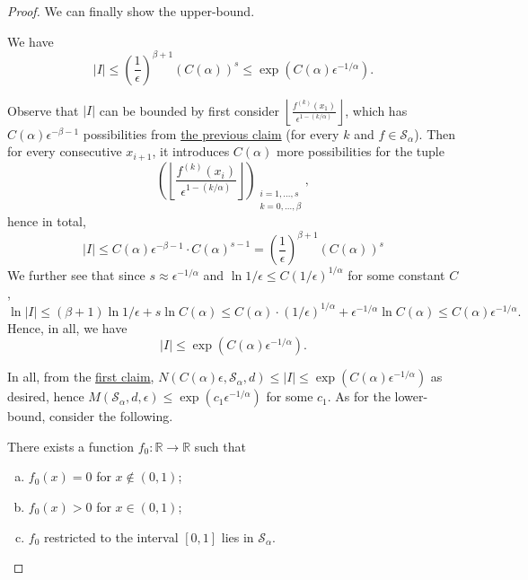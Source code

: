 \begin{proof}
	We can finally show the upper-bound.
	\begin{claim}\label{clm:metric-entropy-e}
		We have
		\[
			\vert I \vert \leq \left( \frac{1}{\epsilon } \right) ^{\beta + 1} (C(\alpha ))^s \leq \exp(C(\alpha ) \epsilon ^{-1 / \alpha }).
		\]
	\end{claim}
	\begin{explanation}
		Observe that \(\vert I \vert \) can be bounded by first consider \(\left\lfloor \frac{f^{(k)}(x_1)}{\epsilon ^{1 - (k / \alpha )}} \right\rfloor\), which has \(C(\alpha )\epsilon ^{-\beta -1}\) possibilities from \hyperref[clm:metric-entropy-b]{the previous claim} (for every \(k\) and \(f\in \mathcal{S} _\alpha \)). Then for every consecutive \(x_{i+1} \), it introduces \(C(\alpha )\) more possibilities for the tuple
		\[
			\left( \left\lfloor \frac{f^{(k)}(x_i)}{\epsilon ^{1 - (k / \alpha )}} \right\rfloor \right)_{\substack{i = 1, \dots , s \\ k = 0, \dots , \beta }}	,
		\]
		hence in total,
		\[
			\vert I \vert
			\leq C(\alpha ) \epsilon ^{- \beta - 1} \cdot C(\alpha )^{s-1}
			= \left( \frac{1}{\epsilon } \right) ^{\beta + 1} (C(\alpha ))^s
		\]
		We further see that since \(s \approx \epsilon ^{-1 / \alpha }\) and \(\ln 1 / \epsilon \leq C (1 / \epsilon )^{1 / \alpha }\) for some constant \(C\),
		\[
			\ln \vert I \vert
			\leq (\beta + 1) \ln 1 / \epsilon + s \ln C(\alpha )
			\leq C(\alpha ) \cdot (1 / \epsilon )^{1 / \alpha } + \epsilon ^{-1 / \alpha } \ln C(\alpha )
			\leq C(\alpha )\epsilon ^{-1 / \alpha }.
		\]
		Hence, in all, we have
		\[
			\vert I \vert \leq \exp \left( C(\alpha ) \epsilon ^{- 1 / \alpha } \right) .
		\]
	\end{explanation}
	In all, from the \hyperref[clm:metric-entropy-a]{first claim}, \(N(C(\alpha )\epsilon , \mathcal{S} _\alpha , d ) \leq \vert I \vert \leq \exp (C(\alpha )\epsilon ^{-1 / \alpha })\) as desired, hence \(M(\mathcal{S} _\alpha , d, \epsilon ) \leq \exp(c_1 \epsilon ^{-1 / \alpha })\) for some \(c_1\). As for the lower-bound, consider the following.
	\begin{claim}
		There exists a function \(f_0 \colon \mathbb{R} \to \mathbb{R} \) such that
		\begin{enumerate}[(a)]
			\item \(f_0(x) = 0 \) for \(x \notin (0, 1)\);
			\item \(f_0(x) > 0\) for \(x \in (0, 1)\);
			\item \(f_0\) restricted to the interval \([0, 1]\) lies in \(\mathcal{S} _\alpha \).

\end{enumerate}
\end{claim}
\end{proof}
